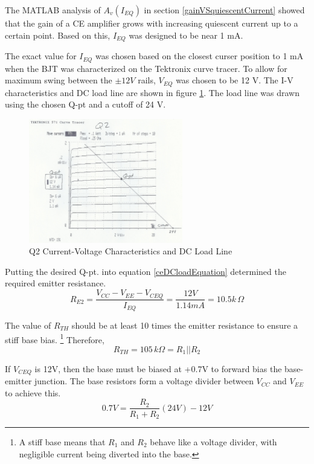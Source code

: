 \documentclass[titlepage, letterpaper, 11pt]{article}
\begin{document}
The MATLAB analysis of $A_{v}(I_{EQ})$ in section
\ref{gainVSquiescentCurrent} showed that the gain of a CE amplifier
grows with increasing quiescent current up to a certain point. Based
on this, $I_{EQ}$ was designed to be near 1 mA.

The exact value for $I_{EQ}$ was chosen based on the closest curser
position to 1 mA when the BJT was characterized on the Tektronix
curve tracer. To allow for maximum swing between the $\pm12V$ rails,
$V_{EQ}$ was chosen to be 12 V. The I-V characteristics and DC load
line are shown in figure \ref{q2Characteristics}. The load line was
drawn using the chosen Q-pt and a cutoff of 24 V.

\begin{figure}[ht]
	\centering
	\includegraphics[width=0.6\textwidth]
		{measurements/q2Characteristics}
	\caption{
		Q2 Current-Voltage Characteristics and DC Load Line
	}
	\label{q2Characteristics}
\end{figure}

Putting the desired Q-pt. into equation \ref{ceDCloadEquation}
determined the required emitter resistance.
\begin{equation*}
R_{E2}=\frac{V_{CC}-V_{EE}-V_{CEQ}}{I_{EQ}}=\frac{12V}{1.14mA}
=10.5k\,\Omega
\end{equation*}

The value of $R_{TH}$ should be at least 10 times the emitter
resistance to ensure a stiff base bias. \footnote{A stiff base means
that $R_{1}$ and $R_{2}$ behave like a voltage divider, with 
negligible current being diverted into the base.} Therefore,
\begin{equation*}
R_{TH}=105\,k\Omega=R_{1}||R_{2}
\end{equation*}

If $V_{CEQ}$ is 12V, then the base must be biased at +0.7V to forward
bias the base-emitter junction. The base resistors form a voltage
divider between $V_{CC}$ and $V_{EE}$ to achieve this.
\begin{equation*}
0.7V=\frac{R_{2}}{R_{1}+R_{2}}(24V)-12V
\end{equation*}
\end{document}
